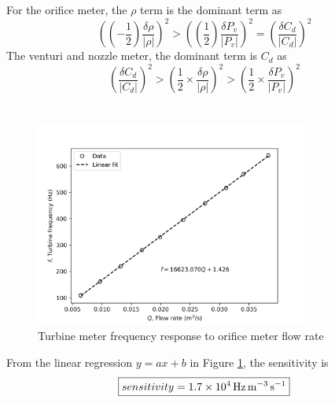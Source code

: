 For the orifice meter, the $\rho$ term is the dominant term as
\begin{equation*}
    \left(\left(-\frac{1}{2}\right)\frac{\delta \rho}{|\rho|}\right)^2 > \left(\left(\frac{1}{2}\right)\frac{\delta P_v}{|P_v|}\right)^2 = \left(\frac{\delta C_d}{|C_d|}\right)^2
\end{equation*}
The venturi and nozzle meter, the dominant term is $C_d$ as 
\begin{equation*}
    \left(\frac{\delta C_d}{|C_d|}\right)^2 > \left(\frac{1}{2}\times \frac{\delta \rho}{|\rho|}\right)^2 > \left(\frac{1}{2}\times \frac{\delta P_v}{|P_v|}\right)^2
\end{equation*}

\section{}
\begin{figure}[h]
    \centering
    \includegraphics[width=0.8\textwidth]{matplotlib/turbine_calibration.png}
    \caption{Turbine meter frequency response to orifice meter flow rate}
    \label{fig:turbine_meter_calibration}
\end{figure}

From the linear regression $y = ax + b$ in Figure \ref{fig:turbine_meter_calibration}, the sensitivity is
\begin{equation*}
    \boxed{sensitivity = \qty{1.7E4}{\hertz\per\meter\cubed\per\second}}
\end{equation*}
